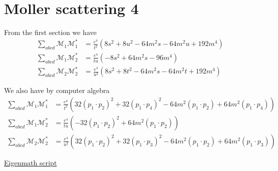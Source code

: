 

\section*{Moller scattering 4}

From the first section we have
\begin{align*}
\sum_{abcd}\mathcal M_1\mathcal M_1^*&=\frac{e^4}{t^2}
\left(8 s^2 + 8 u^2 - 64 m^2 s - 64 m^2 u + 192 m^4\right)
\\
\sum_{abcd}\mathcal M_1\mathcal M_2^*&=\frac{e^4}{tu}
\left(-8 s^2 + 64 m^2 s - 96 m^4\right)
\\
\sum_{abcd}\mathcal M_2\mathcal M_2^*&=\frac{e^4}{u^2}
\left(8 s^2 + 8 t^2 - 64 m^2 s - 64 m^2 t + 192 m^4\right)
\end{align*}

We also have by computer algebra
\begin{align*}
\sum_{abcd}\mathcal M_1\mathcal M_1^*&=\frac{e^4}{t^2}
\left(32 (p_1\cdot p_2)^2 + 32 (p_1\cdot p_4)^2 - 64 m^2 (p_1\cdot p_2) + 64 m^2 (p_1\cdot p_4)\right)
\\
\sum_{abcd}\mathcal M_1\mathcal M_2^*&=\frac{e^4}{tu}
\left(-32 (p_1\cdot p_2)^2 + 64 m^2 (p_1\cdot p_2)\right)
\\
\sum_{abcd}\mathcal M_2\mathcal M_2^*&=\frac{e^4}{u^2}
\left(32 (p_1\cdot p_2)^2 + 32 (p_1\cdot p_3)^2 - 64 m^2 (p_1\cdot p_2) + 64 m^2 (p_1\cdot p_3)\right)
\end{align*}

\href{https://georgeweigt.github.io/examples/moller-scattering-4-demo.html}{Eigenmath script}


